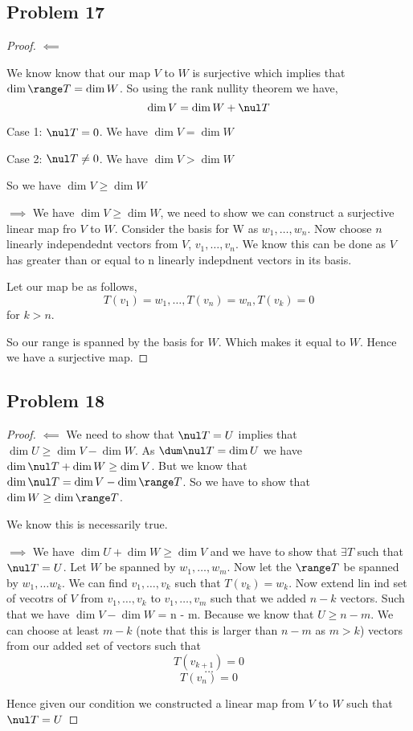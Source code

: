 \documentclass[a4paper]{report}
\begin{document}
\subsection*{Problem 17}
\begin{proof}
    $\impliedby$

    We know know that our map $V$ to $W$ is surjective which implies that $\dim \range T = \dim W$. So using the rank nullity theorem we have,  
    $$ \dim V = \dim W + \nul T $$

    Case 1: $\nul T = 0$. We have $\dim V = \dim W$

    Case 2:  $\nul T \ne 0$. We have $\dim V > \dim W$

    So we have $\dim V \ge \dim W$

     $\implies$
     We have $\dim V \ge \dim W$, we need to show we can construct a surjective linear map fro  $V $ to $W$. Consider the basis for W as $w_1,\dots,w_n$. Now choose $n$ linearly independednt vectors from $V$,  $v_1,\dots,v_n$. We know this can be done as $V$ has greater than or equal to n linearly indepdnent vectors in its basis.

     Let our map be as follows, 
     $$ T(v_1) = w_1,\dots, T(v_n) = w_n, T(v_k) =0 $$  for $k > n$.

     So our range is spanned by  the basis for $W$. Which makes it equal to $W$. Hence we have a surjective map.

\end{proof}

\subsection*{Problem 18}
\begin{proof}
    $\impliedby$ 
    We need to show that $ \nul T = U$ implies that $\dim U \ge \dim V  - \dim W$. As $\dum \nul T = \dim U$ we have $\dim \nul T + \dim W \ge \dim V$. But we know that  $\dim \nul T = \dim V - \dim \range T$. So we have to show that  $\dim W \ge \dim \range T$.

    We know this is necessarily true.

    $\implies$
    We have  $\dim U + \dim W \ge \dim V$ and we have to show that $\exists T$ such that $\nul T = U$. Let $W$ be spanned by $w_1,\dots,w_m$. Now let the $\range T$ be spanned by $w_1,\dots w_k$. We can find $v_1,\dots,v_k$ such that $T(v_k) = w_k$. Now extend lin ind set of vecotrs of $V$ from $v_1,\dots,v_k$ to $v_1,\dots,v_m$ such that we added $n -k$ vectors. Such that we have $\dim V - \dim W $ = n - m. Because we know that $U \ge n - m$. We can choose at least $m - k$ (note that this is larger than $n -m$ as $m > k$) vectors from our added set of vectors such that  
$$ T(v_{k+1}) = 0 $$ 
$$ \dots $$ 
$$ T(v_{n}) = 0 $$ 

Hence given our condition we constructed a linear map from $V$ to $W$ such that $ \nul T = U$
\end{proof}
\end{document}
